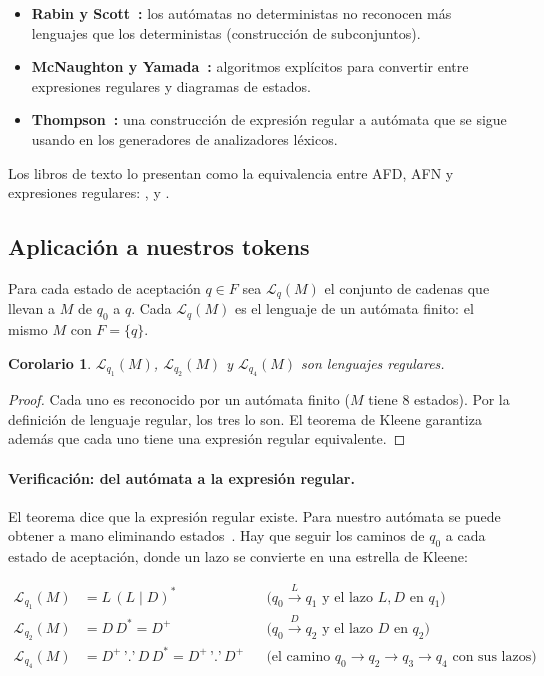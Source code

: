 \documentclass[11pt, a4paper]{article}
\theoremstyle{plain}
\newtheorem{corolario}[teorema]{Corolario}
\theoremstyle{definition}
\newcommand{\pto}{\texttt{'.'}}               %
\newcommand{\Lang}{\mathcal{L}}
\begin{document}
\begin{itemize}
  \item \textbf{Rabin y Scott~\cite{rabinscott}:} los autómatas no deterministas no
    reconocen más lenguajes que los deterministas (construcción de subconjuntos).
  \item \textbf{McNaughton y Yamada~\cite{mcnaughton}:} algoritmos explícitos para
    convertir entre expresiones regulares y diagramas de estados.
  \item \textbf{Thompson~\cite{thompson}:} una construcción de expresión regular a
    autómata que se sigue usando en los generadores de analizadores léxicos.
\end{itemize}

Los libros de texto lo presentan como la equivalencia entre AFD, AFN y expresiones
regulares: \cite[teorema~1.54]{sipser}, \cite[sección~3.2]{hmu} y \cite[secciones~3.6--3.7]{dragon}.

\subsection{Aplicación a nuestros tokens}

Para cada estado de aceptación $q \in F$ sea $\Lang_q(M)$ el conjunto de cadenas que
llevan a $M$ de $q_0$ a $q$. Cada $\Lang_q(M)$ es el lenguaje de un autómata finito: el
mismo $M$ con $F = \{q\}$.

\begin{corolario}
$\Lang_{q_1}(M)$, $\Lang_{q_2}(M)$ y $\Lang_{q_4}(M)$ son lenguajes regulares.
\end{corolario}

\begin{proof}
Cada uno es reconocido por un autómata finito ($M$ tiene 8 estados). Por la definición de
lenguaje regular, los tres lo son. El teorema de Kleene garantiza además que cada uno
tiene una expresión regular equivalente.
\end{proof}

\paragraph{Verificación: del autómata a la expresión regular.} El teorema dice que la
expresión regular existe. Para nuestro autómata se puede obtener a mano eliminando
estados~\cite[sección~3.2.2]{hmu}. Hay que seguir los caminos de $q_0$ a cada estado de
aceptación, donde un lazo se convierte en una estrella de Kleene:

\begin{align*}
  \Lang_{q_1}(M) &= L\,(L \mid D)^{*}
     && \text{($q_0 \xrightarrow{L} q_1$ y el lazo $L, D$ en $q_1$)} \\
  \Lang_{q_2}(M) &= D\,D^{*} = D^{+}
     && \text{($q_0 \xrightarrow{D} q_2$ y el lazo $D$ en $q_2$)} \\
  \Lang_{q_4}(M) &= D^{+}\,\pto\,D\,D^{*} = D^{+}\,\pto\,D^{+}
     && \text{(el camino $q_0 \to q_2 \to q_3 \to q_4$ con sus lazos)}
\end{align*}
\end{document}

